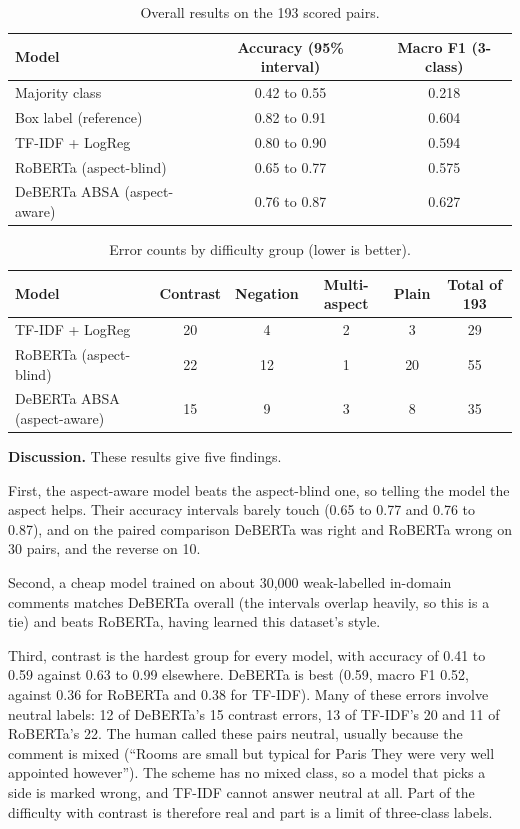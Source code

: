 \documentclass[11pt,a4paper]{article}
\begin{document}
\begin{table}[htb]
\centering
\caption{Overall results on the 193 scored pairs.}
\label{tab:overall}
\begin{tabular}{lcc}
\toprule
Model & Accuracy (95\% interval) & Macro F1 (3-class) \\
\midrule
Majority class & 0.42 to 0.55 & 0.218 \\
Box label (reference) & 0.82 to 0.91 & 0.604 \\
TF-IDF + LogReg & 0.80 to 0.90 & 0.594 \\
RoBERTa (aspect-blind) & 0.65 to 0.77 & 0.575 \\
DeBERTa ABSA (aspect-aware) & 0.76 to 0.87 & 0.627 \\
\bottomrule
\end{tabular}
\end{table}

\begin{table}[htb]
\centering
\caption{Error counts by difficulty group (lower is better).}
\label{tab:errors}
\begin{tabular}{lccccc}
\toprule
Model & Contrast & Negation & Multi-aspect & Plain & Total of 193 \\
\midrule
TF-IDF + LogReg & 20 & 4 & 2 & 3 & 29 \\
RoBERTa (aspect-blind) & 22 & 12 & 1 & 20 & 55 \\
DeBERTa ABSA (aspect-aware) & 15 & 9 & 3 & 8 & 35 \\
\bottomrule
\end{tabular}
\end{table}

\textbf{Discussion.} These results give five findings.

First, the aspect-aware model beats the aspect-blind one, so telling the model the aspect helps. Their accuracy intervals barely touch (0.65 to 0.77 and 0.76 to 0.87), and on the paired comparison DeBERTa was right and RoBERTa wrong on 30 pairs, and the reverse on 10.

Second, a cheap model trained on about 30,000 weak-labelled in-domain comments matches DeBERTa overall (the intervals overlap heavily, so this is a tie) and beats RoBERTa, having learned this dataset's style.

Third, contrast is the hardest group for every model, with accuracy of 0.41 to 0.59 against 0.63 to 0.99 elsewhere. DeBERTa is best (0.59, macro F1 0.52, against 0.36 for RoBERTa and 0.38 for TF-IDF). Many of these errors involve neutral labels: 12 of DeBERTa's 15 contrast errors, 13 of TF-IDF's 20 and 11 of RoBERTa's 22. The human called these pairs neutral, usually because the comment is mixed (``Rooms are small but typical for Paris They were very well appointed however''). The scheme has no mixed class, so a model that picks a side is marked wrong, and TF-IDF cannot answer neutral at all. Part of the difficulty with contrast is therefore real and part is a limit of three-class labels.
\end{document}
